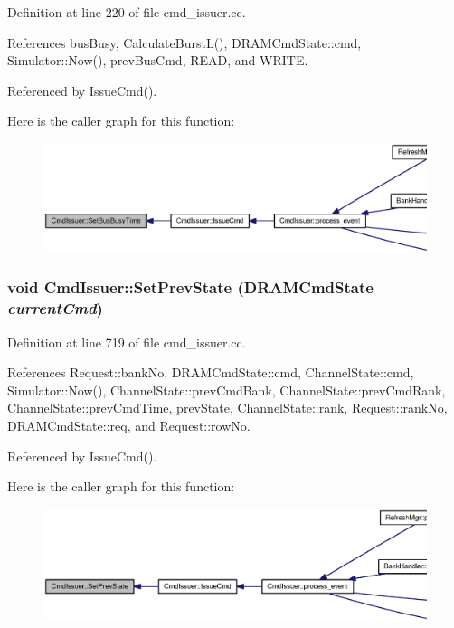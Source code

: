 Definition at line 220 of file cmd\_\-issuer.cc.

References busBusy, CalculateBurstL(), DRAMCmdState::cmd, Simulator::Now(), prevBusCmd, READ, and WRITE.

Referenced by IssueCmd().

Here is the caller graph for this function:\nopagebreak
\begin{figure}[H]
\begin{center}
\leavevmode
\includegraphics[width=420pt]{classCmdIssuer_cad3d934f37eeea768b3eca35b56b558_icgraph}
\end{center}
\end{figure}
\subsubsection[{SetPrevState}]{\setlength{\rightskip}{0pt plus 5cm}void CmdIssuer::SetPrevState ({\bf DRAMCmdState} {\em currentCmd})}\label{classCmdIssuer_bd3ac25d8c718c66445a2e92bb97df0e}




Definition at line 719 of file cmd\_\-issuer.cc.

References Request::bankNo, DRAMCmdState::cmd, ChannelState::cmd, Simulator::Now(), ChannelState::prevCmdBank, ChannelState::prevCmdRank, ChannelState::prevCmdTime, prevState, ChannelState::rank, Request::rankNo, DRAMCmdState::req, and Request::rowNo.

Referenced by IssueCmd().

Here is the caller graph for this function:\nopagebreak
\begin{figure}[H]
\begin{center}
\leavevmode
\includegraphics[width=420pt]{classCmdIssuer_bd3ac25d8c718c66445a2e92bb97df0e_icgraph}
\end{center}
\end{figure}
